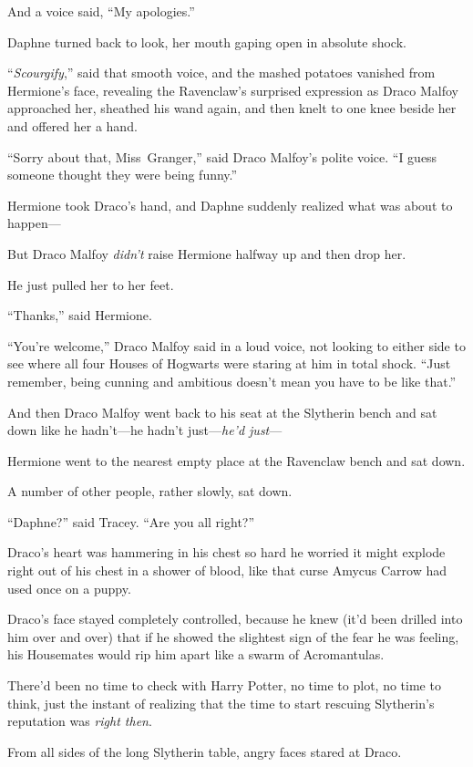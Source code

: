 And a voice said, “My apologies.”

Daphne turned back to look, her mouth gaping open in absolute shock.

“\emph{Scourgify},” said that smooth voice, and the mashed potatoes vanished from Hermione’s face, revealing the Ravenclaw’s surprised expression as Draco Malfoy approached her, sheathed his wand again, and then knelt to one knee beside her and offered her a hand.

“Sorry about that, Miss~Granger,” said Draco Malfoy’s polite voice. “I guess someone thought they were being funny.”

Hermione took Draco’s hand, and Daphne suddenly realized what was about to happen—

But Draco Malfoy \emph{didn’t} raise Hermione halfway up and then drop her.

He just pulled her to her feet.

“Thanks,” said Hermione.

“You’re welcome,” Draco Malfoy said in a loud voice, not looking to either side to see where all four Houses of Hogwarts were staring at him in total shock. “Just remember, being cunning and ambitious doesn’t mean you have to be like that.”

And then Draco Malfoy went back to his seat at the Slytherin bench and sat down like he hadn’t—he hadn’t just—\emph{he’d just}—

Hermione went to the nearest empty place at the Ravenclaw bench and sat down.

A number of other people, rather slowly, sat down.

“Daphne?” said Tracey. “Are you all right?”

\later

Draco’s heart was hammering in his chest so hard he worried it might explode right out of his chest in a shower of blood, like that curse Amycus Carrow had used once on a puppy.

Draco’s face stayed completely controlled, because he knew (it’d been drilled into him over and over) that if he showed the slightest sign of the fear he was feeling, his Housemates would rip him apart like a swarm of Acromantulas.

There’d been no time to check with Harry Potter, no time to plot, no time to think, just the instant of realizing that the time to start rescuing Slytherin’s reputation was \emph{right then}.

From all sides of the long Slytherin table, angry faces stared at Draco.

